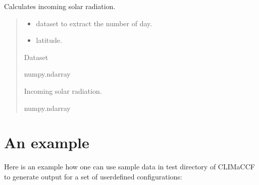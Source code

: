 \documentclass[a4paper,11pt,english]{sphinxmanual}
\begin{document}
\begin{fulllineitems}
\label{\detokenize{modules:envlib.accf.get_Fin}}
\pysigstartsignatures
{}
\pysigstopsignatures
\sphinxAtStartPar
Calculates incoming solar radiation.
\begin{quote}\begin{description}
\begin{itemize}
\item {} 
\sphinxAtStartPar
{} \textendash{} dataset to extract the number of day.

\item {} 
\sphinxAtStartPar
{} \textendash{} latitude.

\end{itemize}

\sphinxAtStartPar
Dataset

\sphinxAtStartPar
numpy.ndarray

\sphinxAtStartPar
Incoming solar radiation.

\sphinxAtStartPar
numpy.ndarray

\end{description}\end{quote}

\end{fulllineitems}



\chapter{An example}
\label{\detokenize{index:an-example}}
\sphinxAtStartPar
Here is an example how one can use sample data in test directory of CLIMaCCF to generate output for a set of user\sphinxhyphen{}defined configurations:
\end{document}
